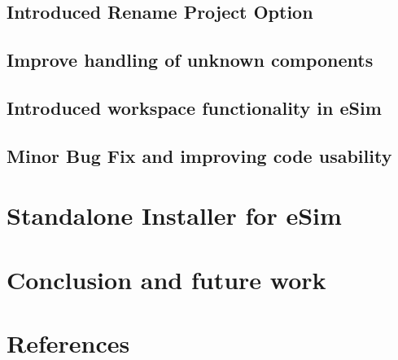 \documentclass[12pt,a4paper]{report}
\begin{document}
\section{Introduced Rename Project Option}
\section{Improve handling of unknown components}
\section{Introduced workspace functionality in eSim}
\section{Minor Bug Fix and improving code usability}

\chapter{\textbf{Standalone Installer for eSim}}

\chapter{\textbf{Conclusion and future work}}

\chapter{\textbf{References}}
\end{document}
